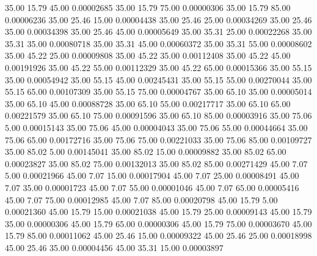      35.00     15.79     45.00     0.00002685
     35.00     15.79     75.00     0.00000306
     35.00     15.79     85.00     0.00006236
     35.00     25.46     15.00     0.00004438
     35.00     25.46     25.00     0.00034269
     35.00     25.46     35.00     0.00034398
     35.00     25.46     45.00     0.00005649
     35.00     35.31     25.00     0.00022268
     35.00     35.31     35.00     0.00080718
     35.00     35.31     45.00     0.00060372
     35.00     35.31     55.00     0.00008602
     35.00     45.22     25.00     0.00009808
     35.00     45.22     35.00     0.00112408
     35.00     45.22     45.00     0.00191926
     35.00     45.22     55.00     0.00112329
     35.00     45.22     65.00     0.00015366
     35.00     55.15     35.00     0.00054942
     35.00     55.15     45.00     0.00245431
     35.00     55.15     55.00     0.00270044
     35.00     55.15     65.00     0.00107309
     35.00     55.15     75.00     0.00004767
     35.00     65.10     35.00     0.00005014
     35.00     65.10     45.00     0.00088728
     35.00     65.10     55.00     0.00217717
     35.00     65.10     65.00     0.00221579
     35.00     65.10     75.00     0.00091596
     35.00     65.10     85.00     0.00003916
     35.00     75.06      5.00     0.00015143
     35.00     75.06     45.00     0.00004043
     35.00     75.06     55.00     0.00044664
     35.00     75.06     65.00     0.00172716
     35.00     75.06     75.00     0.00221033
     35.00     75.06     85.00     0.00109727
     35.00     85.02      5.00     0.00145041
     35.00     85.02     15.00     0.00009882
     35.00     85.02     65.00     0.00023827
     35.00     85.02     75.00     0.00132013
     35.00     85.02     85.00     0.00271429
     45.00      7.07      5.00     0.00021966
     45.00      7.07     15.00     0.00017904
     45.00      7.07     25.00     0.00008491
     45.00      7.07     35.00     0.00001723
     45.00      7.07     55.00     0.00001046
     45.00      7.07     65.00     0.00005416
     45.00      7.07     75.00     0.00012985
     45.00      7.07     85.00     0.00020798
     45.00     15.79      5.00     0.00021360
     45.00     15.79     15.00     0.00021038
     45.00     15.79     25.00     0.00009143
     45.00     15.79     35.00     0.00000306
     45.00     15.79     65.00     0.00000306
     45.00     15.79     75.00     0.00003670
     45.00     15.79     85.00     0.00011062
     45.00     25.46     15.00     0.00009322
     45.00     25.46     25.00     0.00018998
     45.00     25.46     35.00     0.00004456
     45.00     35.31     15.00     0.00003897
